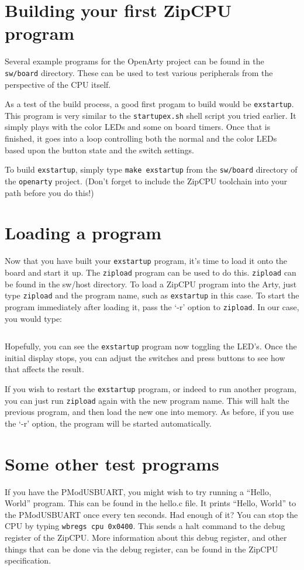 \documentclass{gqtekspec}
\begin{document}
\section{Building your first ZipCPU program}
Several example programs for the OpenArty project can be found in the
{\tt sw/board} directory.  These can be used to test various peripherals from
the perspective of the CPU itself.

As a test of the build process, a good first progam to build would be 
{\tt exstartup}.  This program is very similar to the {\tt startupex.sh} shell
script you tried earlier.  It simply plays with the color LEDs and some
on board timers.   Once that is finished, it goes into a loop controlling
both the normal and the color LEDs based upon the button state and the switch
settings.

To build {\tt exstartup}, simply type {\tt make exstartup} from the 
{\tt sw/board} directory of the {\tt openarty} project.  (Don't forget to
include the ZipCPU toolchain into your path before you do this!)

\section{Loading a program}
Now that you have built your {\tt exstartup} program, it's time to load it
onto the board and start it up.  The {\tt zipload} program can be used to
do this.  {\tt zipload} can be found in the sw/host directory.  To load a
ZipCPU program into the Arty, just type {\tt zipload} and the program name,
such as {\tt exstartup} in this case.  To start the program immediately
after loading it, pass the `-r' option to {\tt zipload}.  In our case, you
would type:
\begin{lstlisting}[language=bash]
% zipload -r exstartup
\end{lstlisting}

Hopefully, you can see the {\tt exstartup} program now toggling the LED's.
Once the initial display stops, you can adjust the switches and press buttons
to see how that affects the result.

If you wish to restart the {\tt exstartup} program, or indeed to run another
program, you can just run {\tt zipload} again with the new program name.  This
will halt the previous program, and then load the new one into memory.  As 
before, if you use the `-r' option, the program will be started automatically.

\section{Some other test programs}
If you have the PModUSBUART, you might wish to try running a ``Hello, World''
program.  This can be found in the hello.c file.  It prints ``Hello, World''
to the PModUSBUART once every ten seconds.  Had enough of it?  You can stop
the CPU by typing {\tt wbregs cpu 0x0400}.  This sends a halt command to the
debug register of the ZipCPU.  More information about this debug register, and
other things that can be done via the debug register, can be found in the
ZipCPU specification.
\end{document}
